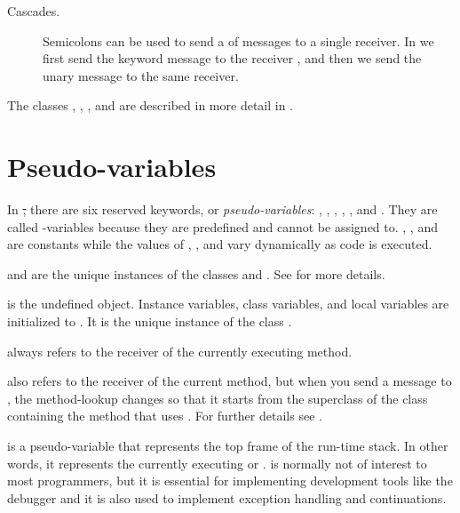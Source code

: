 \documentclass[a4paper,10pt,twoside]{book}
\begin{document}
\begin{description}
\item[Cascades.]
	Semicolons can be used to send a  of messages to a single receiver.
	In  we first send the keyword message  to the receiver , and then we send the unary message  to the same receiver.

\end{description}

The classes , , , and  are described in more detail in .


\section{Pseudo-variables}

In \st, there are six reserved keywords, or \emph{pseudo-variables}:
, , , , , and .
They are called -variables because they are predefined and cannot be assigned to.
, , and  are constants while the values of , , and  vary dynamically as code is executed.

 and  are the unique instances of the  classes  and .
See  for more details.

 is the undefined object.
Instance variables, class variables, and local variables are initialized to .
It is the unique instance of the class .

 always refers to the receiver of the currently executing method.

 also refers to the receiver of the current method, but when you send a message to \super, the method-lookup changes so that it starts from the superclass of the class containing the method that uses .
For further details see .

 is a pseudo-variable that represents the top frame of the run-time stack.
In other words, it represents the currently executing  or .
 is normally not of interest to most programmers, but it is essential for implementing development tools like the debugger and it is also used to implement exception handling and continuations.
\end{document}
